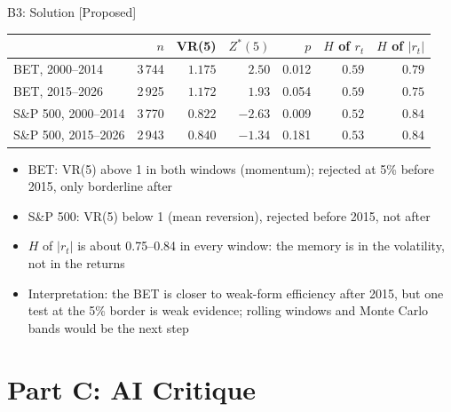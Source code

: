 \ifsolutions
\begin{frame}{B3: Solution [Proposed]}
\itemsize{\footnotesize}
\begin{center}
\scriptsize
\begin{tabular}{lrrrrrr}
\toprule
& $n$ & VR(5) & $Z^*(5)$ & $p$ & $H$ of $r_t$ & $H$ of $|r_t|$ \\
\midrule
BET, 2000--2014 & 3\,744 & ${1.175}$ & ${2.50}$ & 0.012 & ${0.59}$ & ${0.79}$ \\
BET, 2015--2026 & 2\,925 & ${1.172}$ & ${1.93}$ & 0.054 & ${0.59}$ & ${0.75}$ \\
S\&P 500, 2000--2014 & 3\,770 & ${0.822}$ & ${-2.63}$ & 0.009 & ${0.52}$ & ${0.84}$ \\
S\&P 500, 2015--2026 & 2\,943 & ${0.840}$ & ${-1.34}$ & 0.181 & ${0.53}$ & ${0.84}$ \\
\bottomrule
\end{tabular}
\end{center}
\begin{itemize}
    \item BET: VR(5) above 1 in both windows (momentum); rejected at 5\% before 2015, only borderline after
    \item S\&P 500: VR(5) below 1 (mean reversion), rejected before 2015, not after
    \item $H$ of $|r_t|$ is about 0.75--0.84 in every window: the memory is in the volatility, not in the returns
    \item Interpretation: the BET is closer to weak-form efficiency after 2015, but one test at the 5\% border is weak evidence; rolling windows and Monte Carlo bands would be the next step
\end{itemize}
\end{frame}
\fi


\section{Part C: AI Critique}

